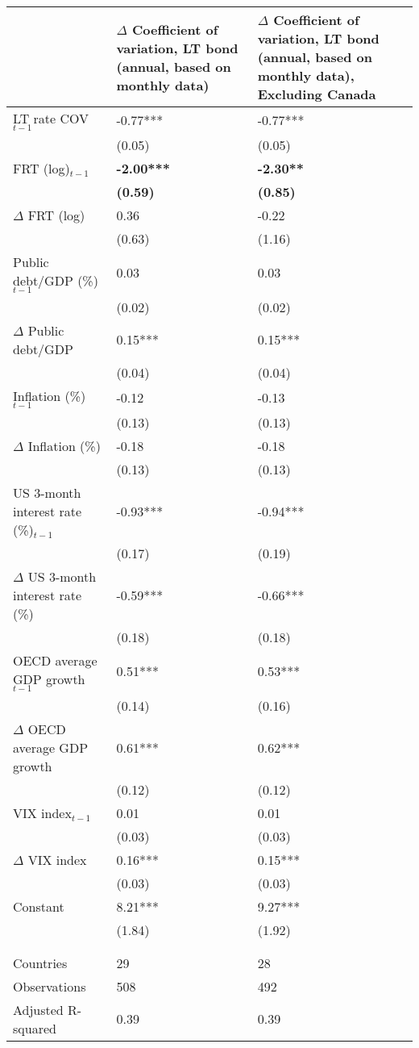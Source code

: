 {\tiny
\begin{tabular}{lp{3cm}p{3cm}}
  \hline
 & $\Delta$ Coefficient of variation, LT bond (annual, based on monthly data) & $\Delta$ Coefficient of variation, LT bond (annual, based on monthly data), \textbf{Excluding Canada} \\ 
  \hline
LT rate COV$_{t-1}$ & -0.77*** & -0.77*** \\ 
   & (0.05) & (0.05) \\ 
  FRT (log)$_{t-1}$ & \textbf{-2.00***} & \textbf{-2.30**} \\ 
   & \textbf{(0.59)} & \textbf{(0.85)} \\ 
  $\Delta$ FRT (log) & 0.36 & -0.22 \\ 
   & (0.63) & (1.16) \\ 
  Public debt/GDP (\%)$_{t-1}$ & 0.03 & 0.03 \\ 
   & (0.02) & (0.02) \\ 
  $\Delta$ Public debt/GDP & 0.15*** & 0.15*** \\ 
   & (0.04) & (0.04) \\ 
  Inflation (\%) $_{t-1}$ & -0.12 & -0.13 \\ 
   & (0.13) & (0.13) \\ 
  $\Delta$ Inflation (\%) & -0.18 & -0.18 \\ 
   & (0.13) & (0.13) \\ 
  US 3-month interest rate (\%)$_{t-1}$ & -0.93*** & -0.94*** \\ 
   & (0.17) & (0.19) \\ 
  $\Delta$ US 3-month interest rate (\%) & -0.59*** & -0.66*** \\ 
   & (0.18) & (0.18) \\ 
  OECD average GDP growth$_{t-1}$ & 0.51*** & 0.53*** \\ 
   & (0.14) & (0.16) \\ 
  $\Delta$ OECD average GDP growth & 0.61*** & 0.62*** \\ 
   & (0.12) & (0.12) \\ 
  VIX index$_{t-1}$ & 0.01 & 0.01 \\ 
   & (0.03) & (0.03) \\ 
  $\Delta$ VIX index & 0.16*** & 0.15*** \\ 
   & (0.03) & (0.03) \\ 
  Constant & 8.21*** & 9.27*** \\ 
   & (1.84) & (1.92) \\ 
   &  &  \\ 
   &  &  \\ 
  Countries & 29 & 28 \\ 
  Observations & 508 & 492 \\ 
  Adjusted R-squared & 0.39 & 0.39 \\ 
   \hline
\end{tabular}
}
